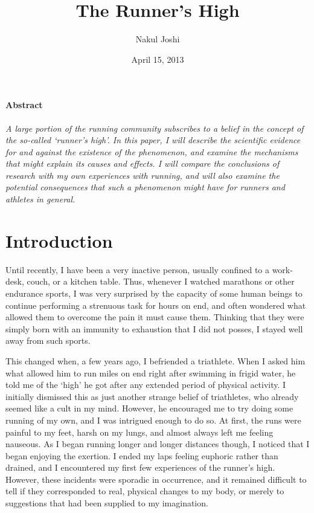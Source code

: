 \documentclass[]{article}
\title{The Runner's High}
\author{Nakul Joshi}
\date{April 15, 2013}
\begin{document}

\maketitle

\paragraph{Abstract} \textit{A large portion of the running community subscribes to a belief in the concept of the so-called `runner's high'. In this paper, I will describe the scientific evidence for and against the existence of the phenomenon, and examine the mechanisms that might explain its causes and effects. I will compare the conclusions of research with my own experiences with running, and will also examine the potential consequences that such a phenomenon might have for runners and athletes in general.}

\section{Introduction}

	Until recently, I have been a very inactive person, usually confined to a work-desk, couch, or a kitchen table. Thus, whenever I watched marathons or other endurance sports, I was very surprised by the capacity of some human beings to continue performing a strenuous task for hours on end, and often wondered what allowed them to overcome the pain it must cause them. Thinking that they were simply born with an immunity to exhaustion that I did not posses, I stayed well away from such sports.
	
	This changed when, a few years ago, I befriended a triathlete. When I asked him what allowed him to run miles on end right after swimming in frigid water, he told me of the `high' he got after any extended period of physical activity. I initially dismissed this as just another strange belief of triathletes, who already seemed like a cult in my mind. However, he encouraged me to try doing some running of my own, and I was intrigued enough to do so. At first, the runs were painful to my feet, harsh on my lungs, and almost always left me feeling nauseous. As I began running longer and longer distances though, I noticed that I began enjoying the exertion. I ended my laps feeling euphoric rather than drained, and I encountered my first few experiences of the runner's high. However, these incidents were sporadic in occurrence, and it remained difficult to tell if they corresponded to real, physical changes to my body, or merely to suggestions that had been supplied to my imagination.
\end{document}
